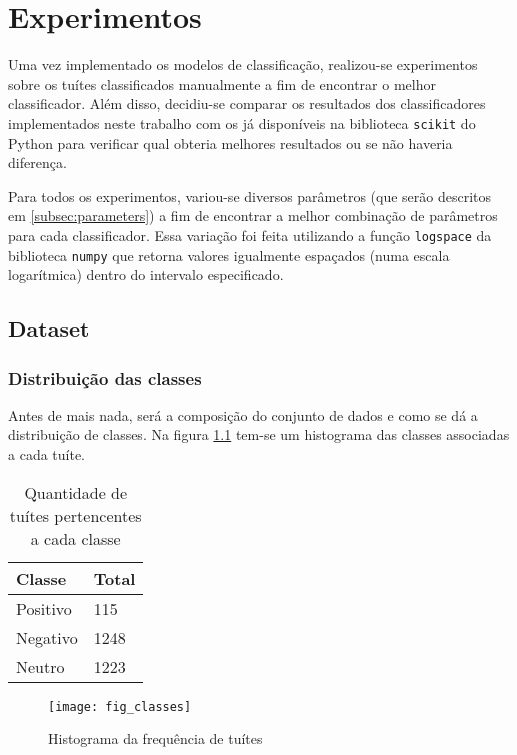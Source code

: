 \chapter{Experimentos}

Uma vez implementado os modelos de classificação, realizou-se experimentos sobre os tuítes
classificados manualmente a fim de encontrar o melhor classificador. Além disso, decidiu-se
comparar os resultados dos classificadores implementados neste trabalho com os já disponíveis
na biblioteca \texttt{scikit} do Python para verificar qual obteria melhores resultados ou se
não haveria diferença.	

Para todos os experimentos, variou-se diversos parâmetros (que serão descritos
em \ref{subsec:parameters}) a fim de encontrar a melhor combinação de parâmetros para cada 
classificador. Essa variação foi feita utilizando a função \texttt{logspace} da biblioteca
\texttt{numpy} que retorna valores igualmente espaçados (numa escala logarítmica) dentro do intervalo 
especificado.

\section{Dataset}

\subsection{Distribuição das classes}

Antes de mais nada, será a composição do conjunto de dados e como se dá
a distribuição de classes. Na figura \ref{fig:classes} tem-se um histograma das classes associadas
a cada tuíte.

\begin{table}[H]
	\begin{center}
		\begin{tabular}{| l | l |}
			\hline
			Classe & Total \\
			\hline
			Positivo & 115 \\
			\hline 
			Negativo & 1248 \\ 
			\hline
			Neutro & 1223 \\ 
			\hline
		\end{tabular}
	\end{center}
	\caption{Quantidade de tuítes pertencentes a cada classe}
	\label{tab:distribution}
\end{table}

\begin{center}
	\begin{figure}[H]
		\texttt{[image: fig\_classes]}
		\caption{Histograma da frequência de tuítes}
		\label{fig:classes}
	\end{figure}
\end{center}

